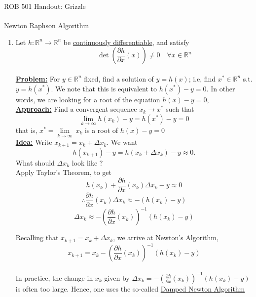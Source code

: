 \documentclass[letterpaper]{article}
\date{}
\newcommand{\Rn}{\mathbb{R}^n}
\newcommand{\R}{\mathbb{R}}
\newcommand{\pardiff}[2][]{\frac{\partial#1}{\partial#2}}
\newcommand{\limin}[2][\infty]{\lim\limits_{#1\rightarrow#2}}
\begin{document}
\baselineskip=48pt
\setlength{\parskip}{.3in}
\setlength{\itemsep}{.3in}

\pagestyle{plain}


{\Large \bf
\begin{center}
ROB 501 Handout: Grizzle \\
\mbox{} \\
Newton Raphson Algorithm
\end{center}
}

\Large

\begin{enumerate}
\setlength{\itemsep}{.2cm}
\item[]
Let $h:\Rn\rightarrow \Rn$ be \underline{continuously differentiable}, and satisfy
$$\quad\quad\quad\boxed{\det\left(\pardiff[h]{x}(x)\right)\neq 0 \quad \forall x\in \R^n}$$ \\

\textbf{\underline{Problem:}} For $y\in \Rn$ fixed, find a solution of $y = h(x)$; i.e, find $x^*\in \Rn$ s.t. $y=h(x^*)$. We note that this is equivalent to $h(x^*)-y=0$. In other words, we are looking for a root of the equation $h(x)-y=0$,\\

\textbf{\underline{Approach:}} Find a convergent sequence $x_k\to x^*$ such that $$\boxed{\limin[k]{\infty}h(x_k)-y=h(x^*)-y=0}$$
that is, $x^*=\limin[k]{\infty}~x_k$ is a root of $h(x)-y=0$ \\

\textbf{\underline{Idea:}} Write $x_{k+1}=x_k+\Delta x_k$. We want
$$h(x_{k+1})-y = h(x_k+\Delta x_k)-y\approx 0.$$
What should $\Delta x_k$ look like ?\\

Apply Taylor's Theorem, to get
$$h(x_k)+\pardiff[h]{x}(x_k)\Delta x_k-y\approx 0$$
$$\therefore \pardiff[h]{x}(x_k)\Delta x_k \approx -(h(x_k)-y)$$
$$\Delta x_k \approx -\left(\pardiff[h]{x}(x_k)\right)^{-1}(h(x_k)-y)$$

Recalling that $x_{k+1}=x_k+\Delta x_k$, we arrive at Newton's Algorithm,
$$\boxed{x_{k+1} = x_k-\left(\pardiff[h]{x}(x_k)\right)^{-1}(h(x_k)-y)}$$\\

In practice, the change in $x_k$ given by  $\Delta x_k = -\left(\pardiff[h]{x}(x_k)\right)^{-1}(h(x_k)-y)$ is often too large. Hence, one uses the so-called \underline{Damped Newton Algorithm}


\end{enumerate}
\end{document}
